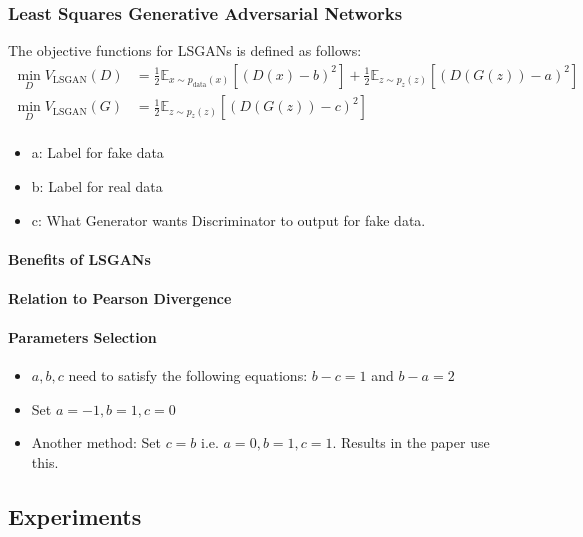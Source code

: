 \documentclass{article}
\begin{document}
    \subsubsection{Least Squares Generative Adversarial Networks}\label{subsubsec:Least_Squares_Generative_Adversarial_Networks_(LS_GAN)_ICCV_2017:ls-gans}
    The objective functions for LSGANs is defined as follows:
    \begin{align*}
        \min_D V_{\textrm{LSGAN}}(D) &= \frac{1}{2} \mathbb{E}_{x \sim p_{\textrm{data}}(x)}\left[(D(x) - b)^2\right] +
        \frac{1}{2} \mathbb{E}_{z \sim p_{z}(z)}\left[(D(G(z)) - a)^2\right] \\
        \min_D V_{\textrm{LSGAN}}(G) &= \frac{1}{2} \mathbb{E}_{z \sim p_{z}(z)}\left[(D(G(z)) - c)^2\right]\\
    \end{align*}
    \begin{itemize}
        \item a: Label for fake data
        \item b: Label for real data
        \item c: What Generator wants Discriminator to output for fake data.
    \end{itemize}

    \paragraph{Benefits of LSGANs}

    \paragraph{Relation to Pearson Divergence}

    \paragraph{Parameters Selection}
    \begin{itemize}
        \item $a,b,c$ need to satisfy the following equations: $b-c=1$ and $b-a=2$
        \item Set $a=-1, b=1, c=0$
        \item Another method: Set $c=b$ i.e. $a=0, b=1, c=1$.
        Results in the paper use this.
    \end{itemize}

    \subsection{Experiments}\label{subsec:Least_Squares_Generative_Adversarial_Networks_(LS_GAN)_ICCV_2017:experiments}
\end{document}
